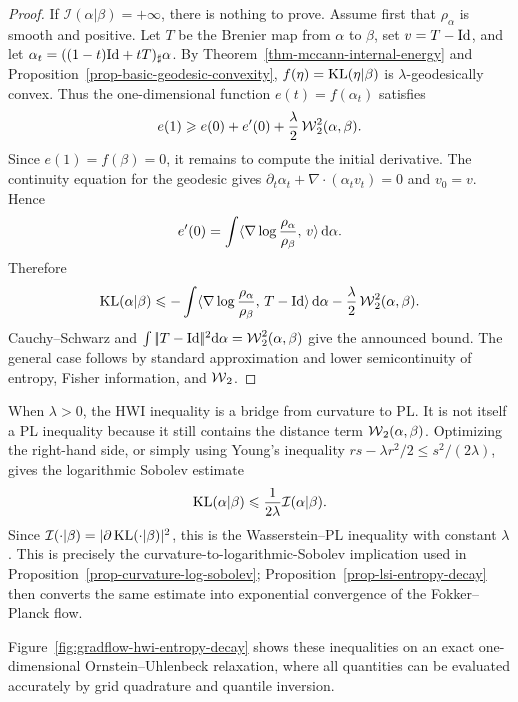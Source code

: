 \begin{proof}
	If $\mathcal I(\alpha|\beta)=+\infty$, there is nothing to prove. Assume first that $\rho_\alpha$ is smooth and positive. Let $T$ be the Brenier map from $\alpha$ to $\beta$, set $v=T-\mathrm{Id}$, and let $\alpha_t=((1-t)\mathrm{Id}+tT)_\sharp\alpha$. By Theorem~\ref{thm-mccann-internal-energy} and Proposition~\ref{prop-basic-geodesic-convexity}, $f(\eta)=\operatorname{KL}(\eta|\beta)$ is $\lambda$-geodesically convex. Thus the one-dimensional function $e(t)=f(\alpha_t)$ satisfies
	\[
		e(1)\geqslant e(0)+e'(0)+\frac{\lambda}{2}\operatorname{\mathcal{W}}_2^2(\alpha,\beta).
	\]
	Since $e(1)=f(\beta)=0$, it remains to compute the initial derivative. The continuity equation for the geodesic gives $\partial_t\alpha_t+\nabla\cdot(\alpha_t v_t)=0$ and $v_0=v$. Hence
	\[
		e'(0)
		=
		\int \langle \nabla\log\frac{\rho_\alpha}{\rho_\beta},\,v\rangle\,\mathrm{d}\alpha.
	\]
	Therefore
	\[
		\operatorname{KL}(\alpha|\beta)
		\leqslant
		-\int \langle \nabla\log\frac{\rho_\alpha}{\rho_\beta},\,T-\mathrm{Id}\rangle\,\mathrm{d}\alpha
		-\frac{\lambda}{2}\operatorname{\mathcal{W}}_2^2(\alpha,\beta).
	\]
		Cauchy--Schwarz and $\int|\!| T-\mathrm{Id} |\!|^2\mathrm{d}\alpha=\operatorname{\mathcal{W}}_2^2(\alpha,\beta)$ give the announced bound. The general case follows by standard approximation and lower semicontinuity of entropy, Fisher information, and $\operatorname{\mathcal{W}}_2$.
\end{proof}

When \(\lambda>0\), the HWI inequality is a bridge from curvature to PL\@. It is not itself a PL inequality because it still contains the distance term \(\operatorname{\mathcal{W}}_2(\alpha,\beta)\). Optimizing the right-hand side, or simply using Young's inequality \(rs-\lambda r^2/2\leq s^2/(2\lambda)\), gives the logarithmic Sobolev estimate
\[
	\operatorname{KL}(\alpha|\beta)
	\leqslant
	\frac{1}{2\lambda}\mathcal I(\alpha|\beta).
\]
Since \(\mathcal I(\cdot|\beta)=|\partial\operatorname{KL}(\cdot|\beta)|^2\), this is the Wasserstein--PL inequality with constant \(\lambda\). This is precisely the curvature-to-logarithmic-Sobolev implication used in Proposition~\ref{prop-curvature-log-sobolev}; Proposition~\ref{prop-lsi-entropy-decay} then converts the same estimate into exponential convergence of the Fokker--Planck flow.

Figure~\ref{fig:gradflow-hwi-entropy-decay} shows these inequalities on an exact one-dimensional Ornstein--Uhlenbeck relaxation, where all quantities can be evaluated accurately by grid quadrature and quantile inversion.

